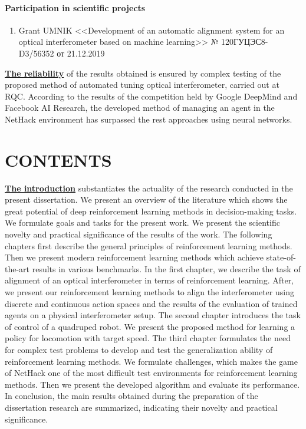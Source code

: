 \paragraph{Participation in scientific projects}
\begin{enumerate}[labelindent=3pt, labelsep=10pt, topsep=10pt, itemsep=5pt]
    \item Grant UMNIK <<Development of an automatic alignment system for an optical interferometer based on machine learning>> № 120ГУЦЭС8-D3/56352 от 21.12.2019

\end{enumerate}


\underline{\textbf{The reliability}} of the results obtained is ensured by complex testing of the proposed method of automated tuning optical interferometer, carried out at RQC. According to the results of the competition held by Google DeepMind and Facebook AI Research, the developed method of managing an agent in the NetHack environment has surpassed the rest approaches using neural networks.


\section*{\centering CONTENTS}
\underline{\textbf{The introduction}} substantiates the actuality of the research conducted in the present dissertation. We present an overview of the literature which shows the great potential of deep reinforcement learning methods in decision-making tasks. We formulate goals and tasks for the present work. We present the scientific novelty and practical significance of the results of the work. The following chapters first describe the general principles of reinforcement learning methods. Then we present modern reinforcement learning methods which achieve state-of-the-art results in various benchmarks. In the first chapter, we describe the task of alignment of an optical interferometer in terms of reinforcement learning. After, we present our reinforcement learning methods to align the interferometer using discrete and continuous action spaces and the results of the evaluation of trained agents on a physical interferometer setup. The second chapter introduces the task of control of a quadruped robot. We present the proposed method for learning a policy for locomotion with target speed. The third chapter formulates the need for complex test problems to develop and test the generalization ability of reinforcement learning methods. We formulate challenges, which makes the game of NetHack one of the most difficult test environments for reinforcement learning methods. Then we present the developed algorithm and evaluate its performance. In conclusion, the main results obtained during the preparation of the dissertation research are summarized, indicating their novelty and practical significance.



